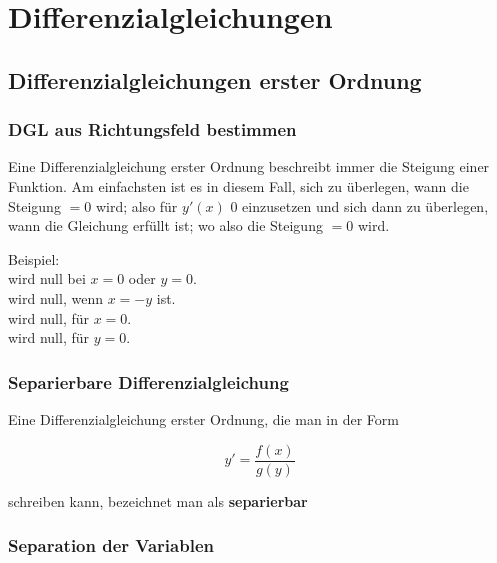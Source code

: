 \documentclass[12pt, a4paper]{scrreprt}
\begin{document}


\tableofcontents
\pagebreak

\setcounter{chapter}{13}
\chapter{Differenzialgleichungen}

\section{Differenzialgleichungen erster Ordnung}

\subsection{DGL aus Richtungsfeld bestimmen}
Eine Differenzialgleichung erster Ordnung beschreibt immer die Steigung einer Funktion. Am einfachsten ist es in diesem Fall, sich zu überlegen, wann die Steigung \(=0\) wird; also für \(y'(x)\) 0 einzusetzen und sich dann zu überlegen, wann die Gleichung erfüllt ist; wo also die Steigung \(=0\) wird.

Beispiel:\\[1em]
 wird null bei \(x = 0\) oder \(y = 0\).\\
 wird null, wenn \(x = -y\) ist.\\
 wird null, für \(x = 0\).\\
 wird null, für \(y = 0\).

\subsection{Separierbare Differenzialgleichung}
Eine Differenzialgleichung erster Ordnung, die man in der Form

\[
  y'=\frac{f(x)}{g(y)}
\]

schreiben kann, bezeichnet man als \textbf{separierbar}

\subsection{Separation der Variablen}
\end{document}
